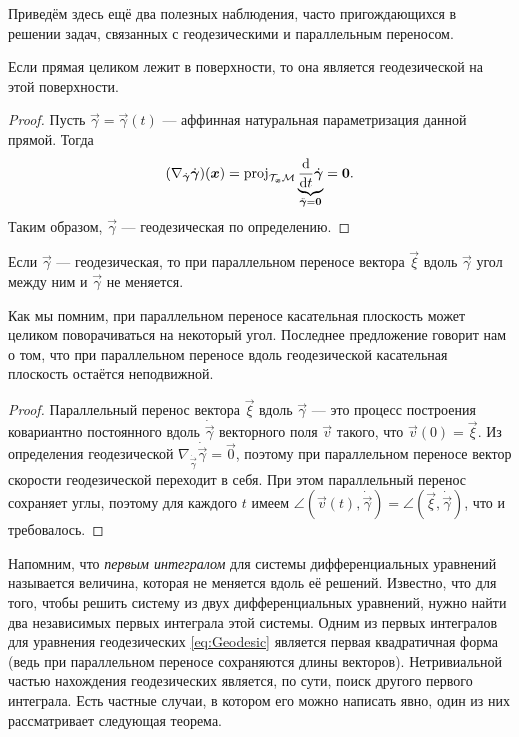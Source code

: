 Приведём здесь ещё два полезных наблюдения, часто пригождающихся в решении задач, связанных с геодезическими и параллельным переносом.

\begin{proposition}
	Если прямая целиком лежит в поверхности, то она является геодезической на этой поверхности.
\end{proposition}

\begin{proof}
	Пусть $\vec{\gamma} = \vec{\gamma}(t)$ --- аффинная натуральная параметризация данной прямой. Тогда
	\[
		(\nabla_{\dot{\boldsymbol{\gamma}}}\dot{\boldsymbol{\gamma}})(\boldsymbol{x}) = \operatorname{proj}_{\mathcal{T}_{\boldsymbol{x}}\mathcal{M}}\underbrace{\frac{\mathop{}\!\mathrm{d}}{\mathop{}\!\mathrm{d} t}\dot{\boldsymbol{\gamma}}}_{\ddot{\boldsymbol{\gamma}} = \boldsymbol{0}} = \boldsymbol{0}.
	\]
	Таким образом, $\vec{\gamma}$ --- геодезическая по определению.
\end{proof}

\begin{proposition}
	Если $\vec{\gamma}$ --- геодезическая, то при параллельном переносе вектора $\vec{\xi}$ вдоль $\vec{\gamma}$ угол между ним и $\vec{\gamma}$ не меняется.
\end{proposition}

Как мы помним, при параллельном переносе касательная плоскость может целиком поворачиваться на некоторый угол. Последнее предложение говорит нам о том, что при параллельном переносе вдоль геодезической касательная плоскость остаётся неподвижной.

\begin{proof}
	Параллельный перенос вектора $\vec{\xi}$ вдоль $\vec{\gamma}$ --- это процесс построения ковариантно постоянного вдоль $\dot{\vec{\gamma}}$ векторного поля $\vec{v}$ такого, что $\vec{v}(0) = \vec{\xi}$. Из определения геодезической $\nabla_{\dot{\vec{\gamma}}}\dot{\vec{\gamma}} = \vec{0}$, поэтому при параллельном переносе вектор скорости геодезической переходит в себя. При этом параллельный перенос сохраняет углы, поэтому для каждого $t$ имеем $\angle(\vec{v}(t), \dot{\vec{\gamma}}) = \angle(\vec{\xi}, \dot{\vec{\gamma}})$, что и требовалось.
\end{proof}

Напомним, что \textit{первым интегралом} для системы дифференциальных уравнений называется величина, которая не меняется вдоль её решений. Известно, что для того, чтобы решить систему из двух дифференциальных уравнений, нужно найти два независимых первых интеграла этой системы. Одним из первых интегралов для уравнения геодезических \eqref{eq:Geodesic} является первая квадратичная форма (ведь при параллельном переносе сохраняются длины векторов). Нетривиальной частью нахождения геодезических является, по сути, поиск другого первого интеграла. Есть частные случаи, в котором его можно написать явно, один из них рассматривает следующая теорема.

